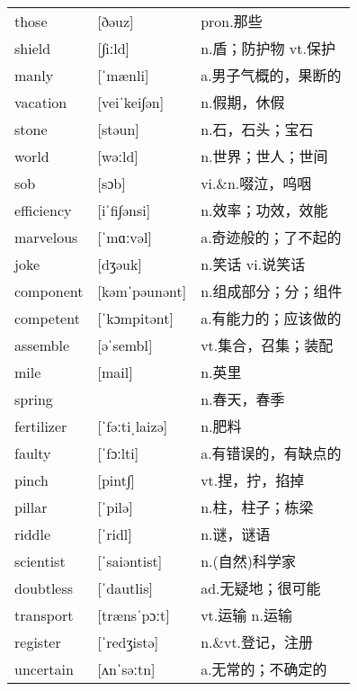 \documentclass[a4paper]{article}
\begin{document}
\section{}
\begin{tabular}{l l l}

those & [ðəuz] & pron.那些 \\
shield & [∫iːld] & n.盾；防护物 vt.保护 \\
manly & [ˈmænli] & a.男子气概的，果断的 \\
vacation & [veiˈkei∫ən] & n.假期，休假 \\
stone & [stəun] & n.石，石头；宝石 \\
world & [wəːld] & n.世界；世人；世间 \\
sob & [sɔb] & vi.\&n.啜泣，呜咽 \\
efficiency & [iˈfi∫ənsi] & n.效率；功效，效能 \\
marvelous & [ˈmɑːvəl] & a.奇迹般的；了不起的 \\
joke & [dʒəuk] & n.笑话 vi.说笑话 \\
component & [kəmˈpəunənt] & n.组成部分；分；组件 \\
competent & [ˈkɔmpitənt] & a.有能力的；应该做的 \\
assemble & [əˈsembl] & vt.集合，召集；装配 \\
mile & [mail] & n.英里 \\
spring &  & n.春天，春季 \\
fertilizer & [ˈfəːtiˌlaizə] & n.肥料 \\
faulty & [ˈfɔːlti] & a.有错误的，有缺点的 \\
pinch & [pint∫] & vt.捏，拧，掐掉 \\
pillar & [ˈpilə] & n.柱，柱子；栋梁 \\
riddle & [ˈridl] & n.谜，谜语 \\
scientist & [ˈsaiəntist] & n.(自然)科学家 \\
doubtless & [ˈdautlis] & ad.无疑地；很可能 \\
transport & [trænsˈpɔːt] & vt.运输 n.运输 \\
register & [ˈredʒistə] & n.\&vt.登记，注册 \\
uncertain & [ʌnˈsəːtn] & a.无常的；不确定的 \\

\end{tabular}
\end{document}
